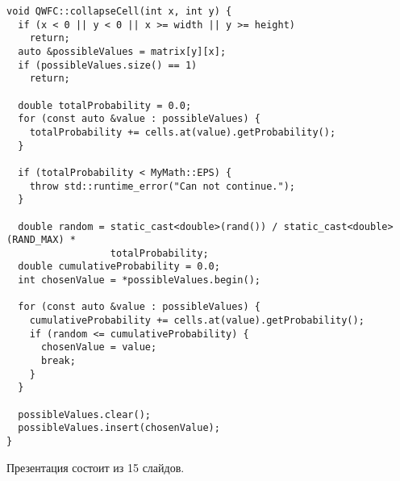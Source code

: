 \begin{lstlisting}[caption={Метод фиксирования состояния ячейки класса QWFC}, label={lst:qwfcoll}]
void QWFC::collapseCell(int x, int y) {
  if (x < 0 || y < 0 || x >= width || y >= height)
    return;
  auto &possibleValues = matrix[y][x];
  if (possibleValues.size() == 1)
    return;

  double totalProbability = 0.0;
  for (const auto &value : possibleValues) {
    totalProbability += cells.at(value).getProbability();
  }

  if (totalProbability < MyMath::EPS) {
    throw std::runtime_error("Can not continue.");
  }

  double random = static_cast<double>(rand()) / static_cast<double>(RAND_MAX) *
                  totalProbability;
  double cumulativeProbability = 0.0;
  int chosenValue = *possibleValues.begin();

  for (const auto &value : possibleValues) {
    cumulativeProbability += cells.at(value).getProbability();
    if (random <= cumulativeProbability) {
      chosenValue = value;
      break;
    }
  }

  possibleValues.clear();
  possibleValues.insert(chosenValue);
}
\end{lstlisting}

\newpage

\renewcommand\thechapter{B}


Презентация состоит из 15 слайдов.